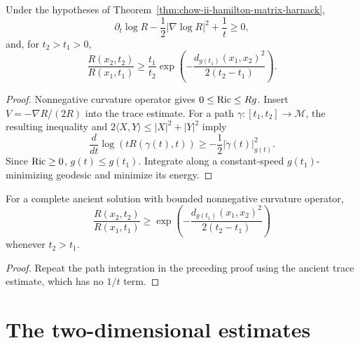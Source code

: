 \begin{corollary}
\label{cor:chow-ii-scalar-curvature-spacetime-comparison}


Under the hypotheses of Theorem~\ref{thm:chow-ii-hamilton-matrix-harnack},
\[
\partial_t\log R-\frac12|\nabla\log R|^2+\frac1t\ge0,
\]
and, for \(t_2>t_1>0\),
\[
\frac{R(x_2,t_2)}{R(x_1,t_1)}\ge\frac{t_1}{t_2}
\exp\!\left(-\frac{d_{g(t_1)}(x_1,x_2)^2}{2(t_2-t_1)}\right).
\]
\end{corollary}
\begin{proof}
\sketch Nonnegative curvature operator gives \(0\le\operatorname{Ric}\le Rg\).  Insert
\(V=-\nabla R/(2R)\) into the trace estimate.  For a path
\(\gamma:[t_1,t_2]\to\mathcal M\), the resulting inequality and
\(2\langle X,Y\rangle\le|X|^2+|Y|^2\) imply
\[
\frac d{dt}\log(tR(\gamma(t),t))\ge-\frac12|\dot\gamma(t)|_{g(t)}^2.
\]
Since \(\operatorname{Ric}\ge0\), \(g(t)\le g(t_1)\).  Integrate along a constant-speed
\(g(t_1)\)-minimizing geodesic and minimize its energy.
\end{proof}

\begin{corollary}
\label{cor:chow-ii-ancient-scalar-curvature-spacetime-comparison}


For a complete ancient solution with bounded nonnegative curvature operator,
\[
\frac{R(x_2,t_2)}{R(x_1,t_1)}\ge
\exp\!\left(-\frac{d_{g(t_1)}(x_1,x_2)^2}{2(t_2-t_1)}\right)
\]
whenever \(t_2>t_1\).
\end{corollary}
\begin{proof}
\sketch Repeat the path integration in the preceding proof using the ancient trace
estimate, which has no \(1/t\) term.
\end{proof}

\section{The two-dimensional estimates}

